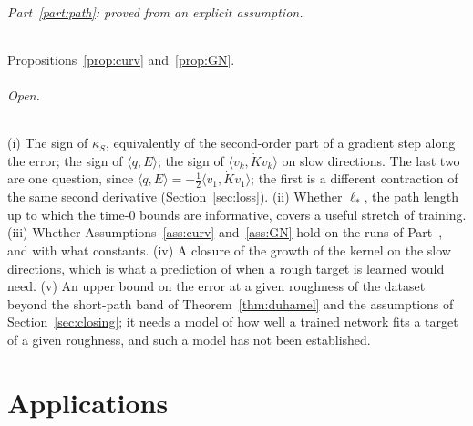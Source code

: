 \documentclass[11pt]{article}
\theoremstyle{definition}
\theoremstyle{remark}
\newcommand{\ip}[2]{\langle #1,#2\rangle}
\begin{document}
\paragraph{Part~\ref{part:path}: proved from an explicit assumption.}
Propositions~\ref{prop:curv} and~\ref{prop:GN}.

\paragraph{Open.}
(i) The sign of $\kappa_S$, equivalently of the second-order part of a gradient step along the error; the sign of $\ip{q}{E}$; the sign of $\ip{v_k}{\dot Kv_k}$ on slow directions. The last two are one question, since $\ip{q}{E} = -\frac12\ip{v_1}{\dot Kv_1}$; the first is a different contraction of the same second derivative (Section~\ref{sec:loss}).
(ii) Whether $\ell_\ast$, the path length up to which the time-0 bounds are informative, covers a useful stretch of training.
(iii) Whether Assumptions~\ref{ass:curv} and~\ref{ass:GN} hold on the runs of Part~\ref{part:apps}, and with what constants.
(iv) A closure of the growth of the kernel on the slow directions, which is what a prediction of when a rough target is learned would need.
(v) An upper bound on the error at a given roughness of the dataset beyond the short-path band of Theorem~\ref{thm:duhamel} and the assumptions of Section~\ref{sec:closing}; it needs a model of how well a trained network fits a target of a given roughness, and such a model has not been established.

\part{Applications}\label{part:apps}
\end{document}

